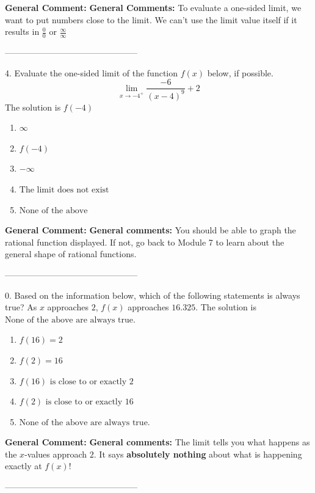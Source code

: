 \documentclass{extbook}[14pt]
\begin{document}
\textbf{General Comment:} \textbf{General Comments:} To evaluate a one-sided limit, we want to put numbers close to the limit. We can't use the limit value itself if it results in $\frac{0}{0}$ or $\frac{\infty}{\infty}$ 

-----------------------------------------------

4. Evaluate the one-sided limit of the function $f(x)$ below, if possible.
\[ \lim_{x \rightarrow -4^+} \frac{-6}{(x-4)^9}+2 \] 
The solution is $ f(-4) $ 

\begin{enumerate}[label=\Alph*.] 
\item $ \infty $ 

  
\item $ f(-4) $ 

  
\item $ -\infty $ 

  
\item $ \text{The limit does not exist} $ 

  
\item $ \text{None of the above} $ 

  
\end{enumerate} 
 
\textbf{General Comment:} \textbf{General comments:} You should be able to graph the rational function displayed. If not, go back to Module 7 to learn about the general shape of rational functions. 

-----------------------------------------------

0. Based on the information below, which of the following statements is always true?
As $x$ approaches $2$, $f(x)$ approaches $16.325$. 
The solution is $ \text{None of the above are always true.} $ 

\begin{enumerate}[label=\Alph*.] 
\item $ f(16) = 2 $ 

  
\item $ f(2) = 16 $ 

  
\item $ f(16) \text{ is close to or exactly } 2 $ 

  
\item $ f(2) \text{ is close to or exactly } 16 $ 

  
\item $ \text{None of the above are always true.} $ 

  
\end{enumerate} 
 
\textbf{General Comment:} \textbf{General comments:} The limit tells you what happens as the $x$-values approach $2$. It says \textbf{absolutely nothing} about what is happening exactly at $f(x)$! 

-----------------------------------------------
\end{document}
